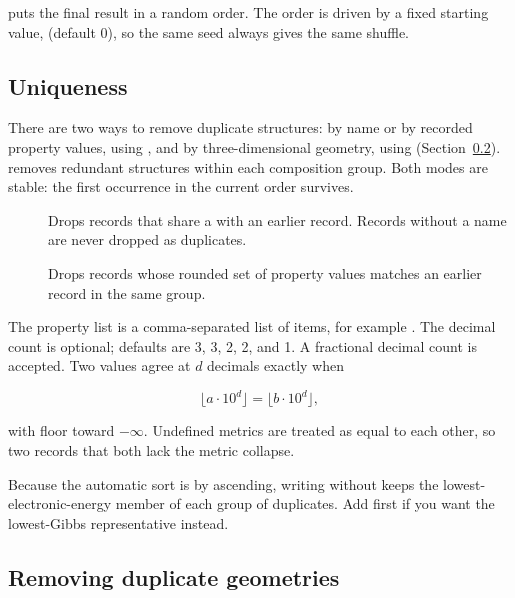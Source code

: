  puts the final result in a random order. The order is driven
by a fixed starting value,  (default 0), so the same seed always
gives the same shuffle.

\subsection{Uniqueness}\label{sec:uniqueness}

There are two ways to remove duplicate structures: by name or by recorded
property values, using , and by three-dimensional geometry, using
 (Section~\ref{sec:arbalign}).  removes
redundant structures within each composition group. Both modes are stable:
the first occurrence in the current order survives.

\begin{description}
  \item[] Drops records that share a  with an earlier
        record. Records without a name are never dropped as duplicates.
  \item[] Drops records whose rounded set of property
        values matches an earlier record in the same group.
\end{description}

The property list is a comma-separated list of  items,
for example . The decimal count is optional; defaults are
 3,  3,  2,  2, and  1. A fractional
decimal count is accepted. Two values agree at $d$ decimals exactly when

\begin{equation}
\lfloor a \cdot 10^d \rfloor = \lfloor b \cdot 10^d \rfloor,
\end{equation}

with floor toward $-\infty$. Undefined metrics are treated as equal to each
other, so two records that both lack the metric collapse.

Because the automatic sort is by  ascending, writing
 without  keeps the lowest-electronic-energy
member of each group of duplicates. Add  first if you want the
lowest-Gibbs representative instead.

\subsection{Removing duplicate geometries}\label{sec:arbalign}

